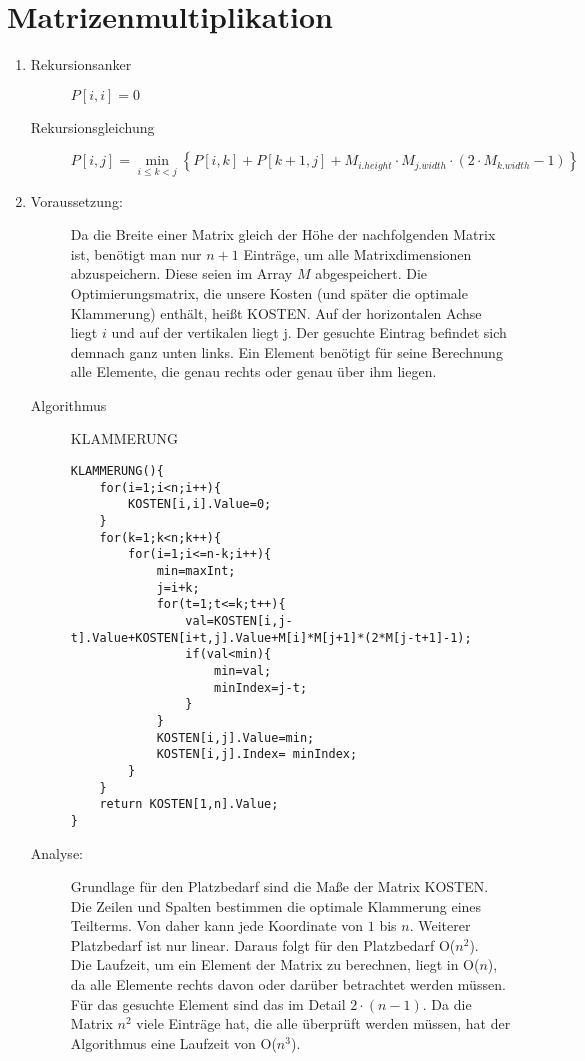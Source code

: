 \documentclass[a4paper,10pt]{scrartcl}
\begin{document}
\section{Matrizenmultiplikation}
\begin{enumerate}
\item \begin{description}
	\item[Rekursionsanker] $P\left[i, i\right] = 0$
	\item[Rekursionsgleichung] $P\left[i, j\right] = \min\limits_{i \leq k < j}\left\{P\left[i, k\right] + P\left[k + 1, j\right] + M_{i.height} \cdot M_{j.width} \cdot \left( 2 \cdot M_{k.width} - 1 \right) \right\}$
\end{description} 
\item \begin{description}
	\item[Voraussetzung:] Da die Breite einer Matrix gleich der Höhe der nachfolgenden Matrix ist, benötigt man nur $n + 1$ Einträge, um alle Matrixdimensionen abzuspeichern. Diese seien im Array $M$ abgespeichert. Die Optimierungsmatrix, die unsere Kosten (und später die optimale Klammerung) enthält, heißt KOSTEN. Auf der horizontalen Achse liegt $i$ und auf der vertikalen liegt j. Der gesuchte Eintrag befindet sich demnach ganz unten links. Ein Element benötigt für seine Berechnung alle Elemente, die genau rechts oder genau über ihm liegen.
	\item[Algorithmus] KLAMMERUNG
\begin{lstlisting}[mathescape=true]
KLAMMERUNG(){
	for(i=1;i<n;i++){
		KOSTEN[i,i].Value=0;
	}
	for(k=1;k<n;k++){
		for(i=1;i<=n-k;i++){
			min=maxInt;
			j=i+k;
			for(t=1;t<=k;t++){
				val=KOSTEN[i,j-t].Value+KOSTEN[i+t,j].Value+M[i]*M[j+1]*(2*M[j-t+1]-1);
				if(val<min){
					min=val;
					minIndex=j-t;
				}
			}
			KOSTEN[i,j].Value=min;
			KOSTEN[i,j].Index= minIndex;
		}
	}
	return KOSTEN[1,n].Value;
}
\end{lstlisting}
	\item[Analyse:] Grundlage für den Platzbedarf sind die Maße der Matrix KOSTEN. Die Zeilen und Spalten bestimmen die optimale Klammerung eines Teilterms. Von daher kann jede Koordinate von $1$ bis $n$. Weiterer Platzbedarf ist nur linear. Daraus folgt für den Platzbedarf O($n^2$).\\
Die Laufzeit, um ein Element der Matrix zu berechnen, liegt in O($n$), da alle Elemente rechts davon oder darüber betrachtet werden müssen. Für das gesuchte Element sind das im Detail $2 \cdot \left( n - 1 \right)$. Da die Matrix $n^2$ viele Einträge hat, die alle überprüft werden müssen, hat der Algorithmus eine Laufzeit von O($n^3$).

\end{description}
\end{enumerate}
\end{document}
